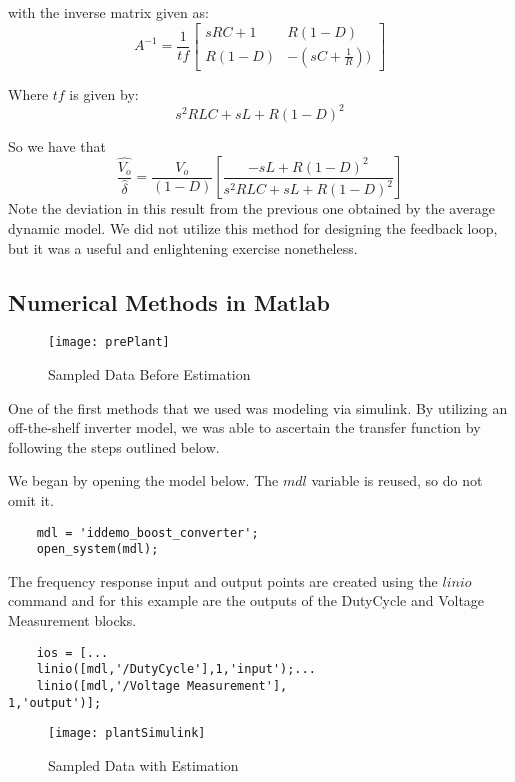 with the inverse matrix given as:
\begin{equation}
A^{-1} = \frac{1}{tf}\begin{bmatrix}
sRC + 1 & R(1-D) \\ 
R(1-D) & -(sC+\frac{1}{R})) 
\end{bmatrix}
\end{equation}

Where $tf$ is given by:
\begin{equation}
s^2RLC + sL + R(1-D)^2
\end{equation}

So we have that 
\begin{equation}
\frac{\hat{V_o}}{\hat{\delta}} = \frac{V_o}{(1-D)}[\frac{-sL + R(1-D)^2}{s^2RLC + sL + R(1-D)^2}]
\end{equation}
Note the deviation in this result from the previous one obtained by the average dynamic model. We did not utilize this method for designing the feedback loop, but it was a useful and enlightening exercise nonetheless.

\subsection{Numerical Methods in Matlab}

\begin{figure}[htbp]
\begin{center}
\texttt{[image: prePlant]}
\caption{Sampled Data Before Estimation}
\label{prePlant}
\end{center}
\end{figure}
One of the first methods that we used was modeling via simulink. By utilizing an off-the-shelf inverter model, we was able to ascertain the transfer function by following the steps outlined below. 

We began by opening the model below. The $mdl$ variable is reused, so do not omit it.
\begin{verbatim}
	mdl = 'iddemo_boost_converter';
	open_system(mdl);
\end{verbatim}
The frequency response input and output points are created using the $linio$ command and for this example are the outputs of the DutyCycle and Voltage Measurement blocks.
\begin{verbatim}
	ios = [...
	linio([mdl,'/DutyCycle'],1,'input');...
	linio([mdl,'/Voltage Measurement'],
1,'output')];
\end{verbatim}

\begin{figure}[htbp]
\begin{center}
\texttt{[image: plantSimulink]}
\caption{Sampled Data with Estimation}
\label{plantSimulink}
\end{center}
\end{figure}

